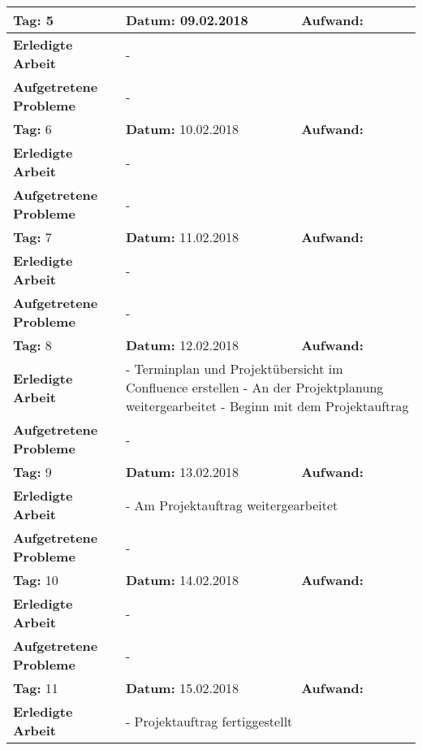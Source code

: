 \begin{longtable}{|p{5cm}|p{5cm}|p{6cm}|}
\rowcolor{heading}\textbf{Tag:} 5 & \textbf{Datum:} 09.02.2018 & \textbf{Aufwand:} \\ \hline
\textbf{Erledigte Arbeit} & \multicolumn{2}{p{11cm}|}{-} \\ \hline
\textbf{Aufgetretene Probleme} & \multicolumn{2}{p{11cm}|}{-} \\ \hline
\rowcolor{heading}\textbf{Tag:} 6 & \textbf{Datum:} 10.02.2018 & \textbf{Aufwand:} \\ \hline
\textbf{Erledigte Arbeit} & \multicolumn{2}{p{11cm}|}{-} \\ \hline
\textbf{Aufgetretene Probleme} & \multicolumn{2}{p{11cm}|}{-} \\ \hline
\rowcolor{heading}\textbf{Tag:} 7 & \textbf{Datum:} 11.02.2018 & \textbf{Aufwand:} \\ \hline
\textbf{Erledigte Arbeit} & \multicolumn{2}{p{11cm}|}{-} \\ \hline
\textbf{Aufgetretene Probleme} & \multicolumn{2}{p{11cm}|}{-} \\ \hline
\rowcolor{heading}\textbf{Tag:} 8 & \textbf{Datum:} 12.02.2018 & \textbf{Aufwand:} \\ \hline
\textbf{Erledigte Arbeit} & \multicolumn{2}{p{11cm}|}{- Terminplan und Projektübersicht im Confluence erstellen \newline
- An der Projektplanung weitergearbeitet \newline
- Beginn mit dem Projektauftrag} \\ \hline
\textbf{Aufgetretene Probleme} & \multicolumn{2}{p{11cm}|}{-} \\ \hline
\rowcolor{heading}\textbf{Tag:} 9 & \textbf{Datum:} 13.02.2018 & \textbf{Aufwand:} \\ \hline
\textbf{Erledigte Arbeit} & \multicolumn{2}{p{11cm}|}{- Am Projektauftrag weitergearbeitet} \\ \hline
\textbf{Aufgetretene Probleme} & \multicolumn{2}{p{11cm}|}{-} \\ \hline
\rowcolor{heading}\textbf{Tag:} 10 & \textbf{Datum:} 14.02.2018 & \textbf{Aufwand:} \\ \hline
\textbf{Erledigte Arbeit} & \multicolumn{2}{p{11cm}|}{-} \\ \hline
\textbf{Aufgetretene Probleme} & \multicolumn{2}{p{11cm}|}{-} \\ \hline
\rowcolor{heading}\textbf{Tag:} 11 & \textbf{Datum:} 15.02.2018 & \textbf{Aufwand:} \\ \hline
\textbf{Erledigte Arbeit} & \multicolumn{2}{p{11cm}|}{- Projektauftrag fertiggestellt \newline
}
\end{longtable}
